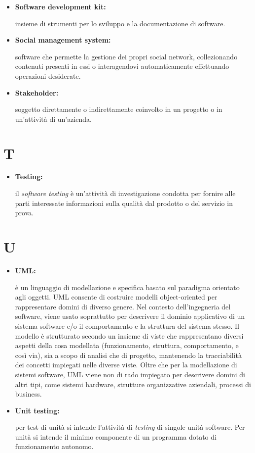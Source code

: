 \begin{itemize}
	\item \hypertarget{sdk}{\textbf{Software development kit:}}  insieme di strumenti per lo sviluppo e la documentazione di software.
	
	\item \hypertarget{sms}{\textbf{Social management system:}} software che permette la gestione dei propri social network, collezionando contenuti presenti in essi o interagendovi automaticamente effettuando operazioni desiderate.
	
	\item \hypertarget{sh}{\textbf{Stakeholder:}} soggetto direttamente o indirettamente coinvolto in un progetto o in un'attività di un'azienda.
\end{itemize}

\section*{T}

\begin{itemize}
	\item \hypertarget{test}{\textbf{Testing:}} il \textit{software testing} è un'attività di investigazione condotta per fornire alle parti interessate informazioni sulla qualità dal prodotto o del servizio in prova.
\end{itemize}

\section*{U}

\begin{itemize}
	\item \hypertarget{uml}{\textbf{UML:}} è un linguaggio di modellazione e specifica basato sul paradigma orientato agli oggetti. UML consente di costruire modelli object-oriented per rappresentare domini di diverso genere. Nel contesto dell'ingegneria del software, viene usato soprattutto per descrivere il dominio applicativo di un sistema software e/o il comportamento e la struttura del sistema stesso. Il modello è strutturato secondo un insieme di viste che rappresentano diversi aspetti della cosa modellata (funzionamento, struttura, comportamento, e così via), sia a scopo di analisi che di progetto, mantenendo la tracciabilità dei concetti impiegati nelle diverse viste. Oltre che per la modellazione di sistemi software, UML viene non di rado impiegato per descrivere domini di altri tipi, come sistemi hardware, strutture organizzative aziendali, processi di business.
	\item \hypertarget{ut}{\textbf{Unit testing:}} per test di unità si intende l'attività di \textit{testing} di singole unità software. Per unità si intende il minimo componente di un programma dotato di funzionamento autonomo. 
\end{itemize}

